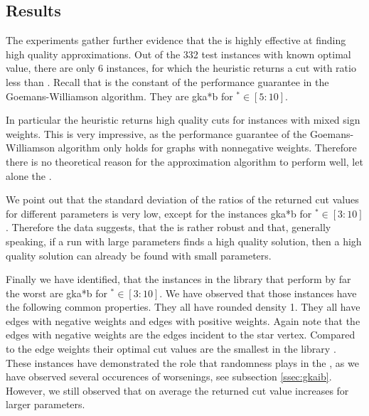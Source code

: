 \documentclass[12pt,a4paper]{article}
\theoremstyle{mythm}
\begin{document}
\subsection{Results} 
The experiments gather further evidence that the \BH is highly effective at finding high quality approximations.
Out of the 332 test instances with known optimal value, there are only 6 instances, for which the heuristic returns a cut with ratio less than \GWconst.
Recall that \GWconst is the constant of the performance guarantee in the Goemans-Williamson algorithm.
They are gka*b for $ ^{ * } \in \left[ 5:10 \right]   $.

In particular the heuristic returns high quality cuts for instances with mixed sign weights.
This is very impressive, as the performance guarantee of the Goemans-Williamson algorithm only holds for graphs with nonnegative weights. Therefore there is no theoretical
reason for the approximation algorithm to perform well, let alone the \BH.

We point out that the standard deviation of the ratios of the returned cut values for different parameters is very low, except for the instances gka*b for $ ^{ * } \in \left[ 3:10 \right] $.
Therefore the data suggests, that the \BH is rather robust and that, generally speaking, if a run with large parameters finds a high quality solution, then a high quality solution can already be
found with small parameters.

Finally we have identified, that the instances in the library \cite{MallachLibrary} that perform by far the worst are gka*b for $ ^{ * } \in \left[ 3:10 \right]   $.
We have observed that those instances have the following common properties.
They all have rounded density 1. 
They all have edges with negative weights and edges with positive weights.
Again note that the edges with negative weights are the edges incident to the star vertex.
Compared to the edge weights their optimal cut values are the smallest in the library \cite{MallachLibrary}.
These instances have demonstrated the role that randomness plays in the \BH, as we have observed several occurences of worsenings, see subsection
\ref{ssec:gkaib}.
However, we still observed that on average the returned cut value increases for larger parameters.
\end{document}

